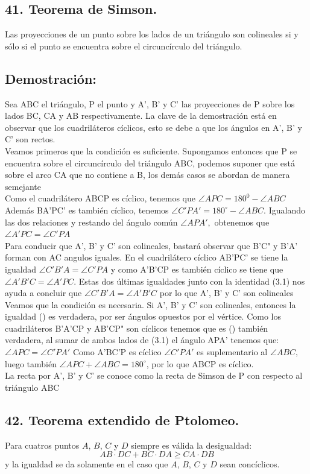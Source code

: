 \documentclass[12pt,a4paper]{article}
\begin{document}
\subsection*{41. Teorema de Simson.}
Las proyecciones de un punto sobre los lados de un triángulo son colineales si y sólo si el punto se encuentra sobre el circuncírculo del triángulo.
\subsection*{Demostración:}
Sea ABC el triángulo, P el punto y A', B' y C' las proyecciones de P sobre los lados BC, CA y AB respectivamente. La clave de la demostración está en observar que los cuadriláteros cíclicos, esto se debe a que los ángulos en A', B' y C' son rectos.
\\Veamos primeros que la condición es suficiente. Supongamos entonces que P se encuentra sobre el circuncírculo  del triángulo ABC, podemos suponer que está sobre el arco CA que no contiene a B, los demás casos se abordan de manera semejante
\\Como el cuadrilátero ABCP es cíclico, tenemos que $\angle APC= 180^0 - \angle ABC$ Además  BA'PC' es también cíclico, tenemos $\angle C'PA'= 180^\circ - \angle ABC.$ Igualando las dos relaciones y restando del ángulo común $\angle APA',$ obtenemos que $\angle A'PC = \angle C'PA$
\\Para conducir que A', B' y C' son colineales, bastará observar que  B'C" y B'A' forman con AC angulos iguales. En el cuadrilátero cíclico AB'PC' se tiene la igualdad $\angle C'B'A =\angle C'PA$ y como A'B'CP es también cíclico se tiene que $\angle A'B'C = \angle A'PC$. Estas dos últimas igualdades junto con la identidad (3.1) nos ayuda a concluir que $ \angle C'B'A = \angle A'B'C$ por lo que A', B' y C' son colineales
\\Veamos que la condición es necesaria. Si A', B' y C' son colineales, entonces la igualdad () es verdadera, por ser ángulos opuestos por el vértice. Como los cuadriláteros B'A'CP y AB'CP" son cíclicos tenemos que es () también  verdadera, al sumar de ambos lados de (3.1) el ángulo APA' tenemos que: $\angle APC = \angle C'PA'$ Como A'BC'P es cíclico $\angle C'PA'$ es suplementario al $\angle ABC,$ luego también $\angle APC + \angle ABC = 180 ^\circ$, por lo que ABCP es cíclico.
\\La recta por A', B' y C' se conoce como la recta de Simson de P con respecto al triángulo ABC
 
\subsection*{42. Teorema extendido de Ptolomeo.}
Para cuatros puntos $A$, $B$, $C$ y $D$ siempre es válida la desigualdad:$$AB \cdot DC + BC\cdot DA \geq CA \cdot DB$$ y la igualdad se da solamente en el caso que $A$, $B$, $C$ y $D$ sean concíclicos.
\end{document}
